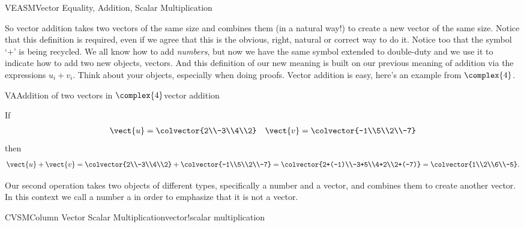 \begin{subsect}{VEASM}{Vector Equality, Addition, Scalar Multiplication}
\begin{para}So vector addition takes two vectors of the same size and combines them (in a natural way!) to create a new vector of the same size.  Notice that this definition is required, even if we agree that this is the obvious, right, natural or correct way to do it.  Notice too that the symbol `+' is being recycled.  We all know how to add {\em numbers}, but now we have the same symbol extended to double-duty and we use it to indicate how to add two new objects, vectors.  And this definition of our new meaning is built on our previous meaning of addition via the expressions $u_i+v_i$.  Think about your objects, especially when doing proofs.  Vector addition is easy, here's an example from $\complex{4}$.\end{para}
%
\begin{example}{VA}{Addition of two vectors in $\complex{4}$}{vector addition}
\begin{para}If
%
\begin{align*}
\vect{u}=\colvector{2\\-3\\4\\2}&&\vect{v}=\colvector{-1\\5\\2\\-7}
\end{align*}
%
then
%
\begin{equation*}
\vect{u}+\vect{v}=
\colvector{2\\-3\\4\\2}+\colvector{-1\\5\\2\\-7}=
\colvector{2+(-1)\\-3+5\\4+2\\2+(-7)}=
\colvector{1\\2\\6\\-5}.
\end{equation*}
\end{para}
%
\end{example}
%
\begin{para}Our second operation takes two objects of different types, specifically a number and a vector, and combines them to create another vector.  In this context we call a number a  in order to emphasize that it is not a vector.\end{para}
%
\begin{definition}{CVSM}{Column Vector Scalar Multiplication}{vector!scalar multiplication}

\end{definition}
\end{subsect}
